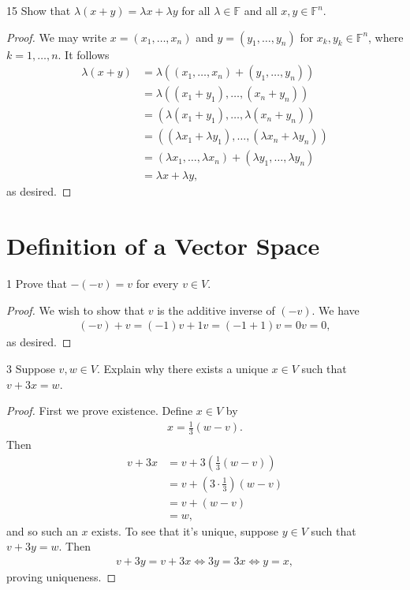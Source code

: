 \documentclass{extarticle}
\newenvironment{problem}[1]{\begin{prob*}{#1}{}}{\end{prob*}}
\newcommand{\F}{\mathbb{F}}
\begin{document}
\begin{problem}{15}
Show that $\lambda(x + y)=\lambda x +\lambda y$ for all $\lambda\in\F$ and all $x,y\in\F^n$.
\end{problem}
\begin{proof}
We may write $x = (x_1, \dots, x_n)$ and $y = (y_1,\dots,y_n)$ for $x_k,y_k\in\F^n$, where $k=1,\dots,n$.  It follows
\begin{align*}
\lambda(x+y) &= \lambda( (x_1,\dots,x_n) + (y_1,\dots,y_n) )\\
&= \lambda ( (x_1 + y_1),\dots,(x_n + y_n) )\\
&= (\lambda (x_1 + y_1),\dots,\lambda(x_n + y_n) )\\
&= ((\lambda x_1 + \lambda y_1),\dots,(\lambda x_n + \lambda y_n))\\
&= (\lambda x_1,\dots,\lambda x_n) + (\lambda y_1,\dots,\lambda y_n)\\
&= \lambda x + \lambda y,
\end{align*}
as desired.
\end{proof}


\section{Definition of a Vector Space}

\begin{problem}{1}
Prove that $-(-v)=v$ for every $v\in V$.
\end{problem}
\begin{proof}
We wish to show that $v$ is the additive inverse of $(-v)$.  We have
\begin{align*}
(-v) + v = (-1)v + 1v = (-1 + 1)v = 0v = 0,
\end{align*}
as desired.
\end{proof}

\begin{problem}{3}
Suppose $v,w\in V$.  Explain why there exists a unique $x\in V$ such that $v + 3x = w$.
\end{problem}
\begin{proof}
First we prove existence.  Define $x\in V$ by
\begin{align*}
x = \frac{1}{3}(w - v).
\end{align*}
Then
\begin{align*}
v + 3x &= v + 3\left( \frac{1}{3}(w - v)\right) \\
&= v + \left(3 \cdot \frac{1}{3}\right)(w-v)\\
&= v + (w - v)\\
&= w,
\end{align*}
and so such an $x$ exists.  To see that it's unique, suppose $y\in V$ such that $v + 3y = w$.  Then
\begin{align*}
v + 3y = v + 3x \iff 3y = 3x \iff y = x,
\end{align*}
proving uniqueness.
\end{proof}
\end{document}
